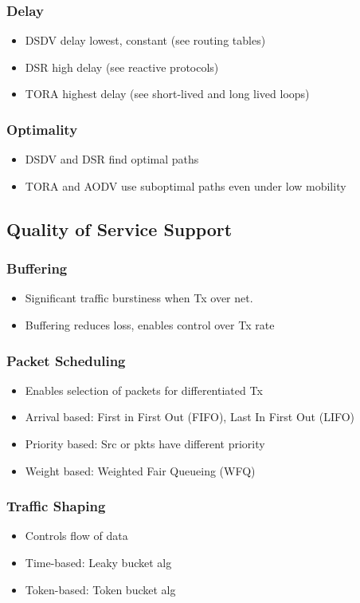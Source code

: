 \subsubsection{Delay}
\begin{itemize}
	\item DSDV delay lowest, constant (see routing tables)
	\item DSR high delay (see reactive protocols)
	\item TORA highest delay (see short-lived and long lived loops)
\end{itemize}
\subsubsection{Optimality}
\begin{itemize}
	\item DSDV and DSR find optimal paths
	\item TORA and AODV use suboptimal paths even under low mobility
\end{itemize}
\subsection{Quality of Service Support}
\subsubsection{Buffering}
\begin{itemize}
	\item Significant traffic burstiness when Tx over net.
	\item Buffering reduces loss, enables control over Tx rate
\end{itemize}
\subsubsection{Packet Scheduling}
\begin{itemize}
	\item Enables selection of packets for differentiated Tx
	\item Arrival based: First in First Out (FIFO), Last In First Out (LIFO)
	\item Priority based: Src or pkts have different priority
	\item Weight based: Weighted Fair Queueing (WFQ)
\end{itemize}
\subsubsection{Traffic Shaping}
\begin{itemize}
	\item Controls flow of data
	\item Time-based: Leaky bucket alg
	\item Token-based: Token bucket alg
\end{itemize}
